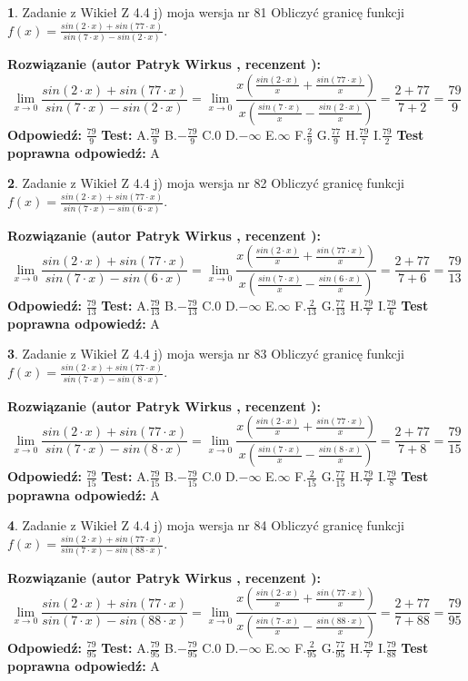 \documentclass[12pt, a4paper]{article}
\theoremstyle{definition} %
\newtheorem{zad}{}
\newcommand{\zadStart}[1]{\begin{zad}#1\newline}
\newcommand{\zadStop}{\end{zad}}
\newcommand{\rozwStart}[2]{\noindent \textbf{Rozwiązanie (autor #1 , recenzent #2): }\newline}
\newcommand{\rozwStop}{\newline}
\newcommand{\odpStart}{\noindent \textbf{Odpowiedź:}\newline}
\newcommand{\odpStop}{\newline}
\newcommand{\testStart}{\noindent \textbf{Test:}\newline}
\newcommand{\testStop}{\newline}
\newcommand{\kluczStart}{\noindent \textbf{Test poprawna odpowiedź:}\newline}
\newcommand{\kluczStop}{\newline}
\begin{document}
\zadStart{Zadanie z Wikieł Z 4.4 j) moja wersja nr 81}
Obliczyć granicę funkcji $f(x)=\frac{sin(2\cdot x) +sin(77\cdot x)}{sin(7\cdot x) -sin(2\cdot x)}$.
\zadStop
\rozwStart{Patryk Wirkus}{}
$$\lim\limits_{x\to 0}\frac{sin(2\cdot x) +sin(77\cdot x)}{sin(7\cdot x) -sin(2\cdot x)}=\lim\limits_{x\to 0}\frac{x(\frac{sin(2\cdot x)}{x}+\frac{sin(77\cdot x)}{x})}{x(\frac{sin(7\cdot x)}{x}-\frac{sin(2\cdot x)}{x})}=\frac{2+77}{7+2} = \frac{79}{9}$$
\rozwStop
\odpStart
$\frac{79}{9}$
\odpStop
\testStart
A.$\frac{79}{9}$
B.$-\frac{79}{9}$
C.$0$
D.$-\infty$
E.$\infty$
F.$\frac{2}{9}$
G.$\frac{77}{9}$
H.$\frac{79}{7}$
I.$\frac{79}{2}$
\testStop
\kluczStart
A
\kluczStop



\zadStart{Zadanie z Wikieł Z 4.4 j) moja wersja nr 82}
Obliczyć granicę funkcji $f(x)=\frac{sin(2\cdot x) +sin(77\cdot x)}{sin(7\cdot x) -sin(6\cdot x)}$.
\zadStop
\rozwStart{Patryk Wirkus}{}
$$\lim\limits_{x\to 0}\frac{sin(2\cdot x) +sin(77\cdot x)}{sin(7\cdot x) -sin(6\cdot x)}=\lim\limits_{x\to 0}\frac{x(\frac{sin(2\cdot x)}{x}+\frac{sin(77\cdot x)}{x})}{x(\frac{sin(7\cdot x)}{x}-\frac{sin(6\cdot x)}{x})}=\frac{2+77}{7+6} = \frac{79}{13}$$
\rozwStop
\odpStart
$\frac{79}{13}$
\odpStop
\testStart
A.$\frac{79}{13}$
B.$-\frac{79}{13}$
C.$0$
D.$-\infty$
E.$\infty$
F.$\frac{2}{13}$
G.$\frac{77}{13}$
H.$\frac{79}{7}$
I.$\frac{79}{6}$
\testStop
\kluczStart
A
\kluczStop



\zadStart{Zadanie z Wikieł Z 4.4 j) moja wersja nr 83}
Obliczyć granicę funkcji $f(x)=\frac{sin(2\cdot x) +sin(77\cdot x)}{sin(7\cdot x) -sin(8\cdot x)}$.
\zadStop
\rozwStart{Patryk Wirkus}{}
$$\lim\limits_{x\to 0}\frac{sin(2\cdot x) +sin(77\cdot x)}{sin(7\cdot x) -sin(8\cdot x)}=\lim\limits_{x\to 0}\frac{x(\frac{sin(2\cdot x)}{x}+\frac{sin(77\cdot x)}{x})}{x(\frac{sin(7\cdot x)}{x}-\frac{sin(8\cdot x)}{x})}=\frac{2+77}{7+8} = \frac{79}{15}$$
\rozwStop
\odpStart
$\frac{79}{15}$
\odpStop
\testStart
A.$\frac{79}{15}$
B.$-\frac{79}{15}$
C.$0$
D.$-\infty$
E.$\infty$
F.$\frac{2}{15}$
G.$\frac{77}{15}$
H.$\frac{79}{7}$
I.$\frac{79}{8}$
\testStop
\kluczStart
A
\kluczStop



\zadStart{Zadanie z Wikieł Z 4.4 j) moja wersja nr 84}
Obliczyć granicę funkcji $f(x)=\frac{sin(2\cdot x) +sin(77\cdot x)}{sin(7\cdot x) -sin(88\cdot x)}$.
\zadStop
\rozwStart{Patryk Wirkus}{}
$$\lim\limits_{x\to 0}\frac{sin(2\cdot x) +sin(77\cdot x)}{sin(7\cdot x) -sin(88\cdot x)}=\lim\limits_{x\to 0}\frac{x(\frac{sin(2\cdot x)}{x}+\frac{sin(77\cdot x)}{x})}{x(\frac{sin(7\cdot x)}{x}-\frac{sin(88\cdot x)}{x})}=\frac{2+77}{7+88} = \frac{79}{95}$$
\rozwStop
\odpStart
$\frac{79}{95}$
\odpStop
\testStart
A.$\frac{79}{95}$
B.$-\frac{79}{95}$
C.$0$
D.$-\infty$
E.$\infty$
F.$\frac{2}{95}$
G.$\frac{77}{95}$
H.$\frac{79}{7}$
I.$\frac{79}{88}$
\testStop
\kluczStart
A
\kluczStop
\end{document}
